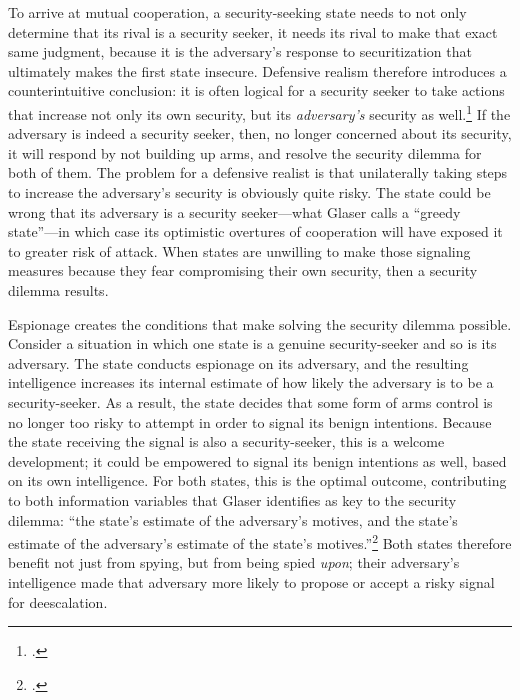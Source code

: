 \documentclass[12pt]{extarticle}
\begin{document}
To arrive at mutual cooperation, a security-seeking state needs to not only determine that its rival is a security seeker, it needs its rival to make that exact same judgment, because it is the adversary's response to securitization that ultimately makes the first state insecure. Defensive realism therefore introduces a counterintuitive conclusion: it is often logical for a security seeker to take actions that increase not only its own security, but its \emph{adversary's} security as well.\footcite[7]{glaser_rational_2010} If the adversary is indeed a security seeker, then, no longer concerned about its security, it will respond by not building up arms, and resolve the security dilemma for both of them. The problem for a defensive realist is that unilaterally taking steps to increase the adversary's security is obviously quite risky. The state could be wrong that its adversary is a security seeker---what Glaser calls a \enquote{greedy state}---in which case its optimistic overtures of cooperation will have exposed it to greater risk of attack. When states are unwilling to make those signaling measures because they fear compromising their own security, then a security dilemma results.

Espionage creates the conditions that make solving the security dilemma possible. Consider a situation in which one state is a genuine security-seeker and so is its adversary. The state conducts espionage on its adversary, and the resulting intelligence increases its internal estimate of how likely the adversary is to be a security-seeker. As a result, the state decides that some form of arms control is no longer too risky to attempt in order to signal its benign intentions. Because the state receiving the signal is also a security-seeker, this is a welcome development; it could be empowered to signal its benign intentions as well, based on its own intelligence. For both states, this is the optimal outcome, contributing to both information variables that Glaser identifies as key to the security dilemma: \enquote{the state’s estimate of the adversary’s motives, and the state’s estimate of the adversary’s estimate of the state’s motives.}\footcite[34-35]{glaser_rational_2010} Both states therefore benefit not just from spying, but from being spied \emph{upon}; their adversary's intelligence made that adversary more likely to propose or accept a risky signal for deescalation.
\end{document}
